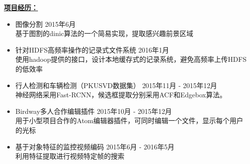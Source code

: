 \documentclass[UTF8]{ctexart}
\begin{document}
\medskip
{\large \textbf{\underline{项目经历：}}}\\
\begin{itemize}
\item 图像分割 \hfill{2015年6月}\\
\smallskip
\small 基于图割的dinic算法的一个简易实现，提取感兴趣前景区域
\normalsize

\item 针对HDFS高频率操作的记录式文件系统 \hfill{2016年1月}\\
\smallskip
\small 使用hadoop提供的接口，设计本地缓存式的记录系统，避免高频率上传HDFS的低效率

\normalsize
\item 行人检测和车辆检测（PKUSVD数据集） \hfill{2015年11月 - 2015年12月}\\
\smallskip
\small 神经网络采用Fast-RCNN，候选框提取分别采用ACF和Edgebox算法。

\normalsize
\item Birdway多人合作编辑插件 \hfill{2015年10月 - 2015年12月}\\
\smallskip
\small 用于小型项目合作的Atom编辑器插件，可同时编辑一个文件，显示每个用户的光标

\normalsize
\item 基于对象特征的监控视频编码 \hfill{2015年6月 - 2016年5月}\\
\smallskip
\small \small{利用特征提取进行视频特定帧的搜索}

\end{itemize}
\end{document}
